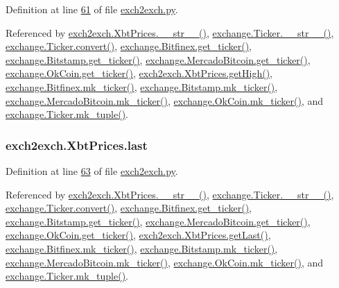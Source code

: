 Definition at line \hyperlink{exch2exch_8py_source_l00061}{61} of file \hyperlink{exch2exch_8py_source}{exch2exch.\+py}.



Referenced by \hyperlink{exch2exch_8py_source_l00091}{exch2exch.\+Xbt\+Prices.\+\_\+\+\_\+str\+\_\+\+\_\+()}, \hyperlink{exchange_8py_source_l00111}{exchange.\+Ticker.\+\_\+\+\_\+str\+\_\+\+\_\+()}, \hyperlink{exchange_8py_source_l00065}{exchange.\+Ticker.\+convert()}, \hyperlink{exchange_8py_source_l00332}{exchange.\+Bitfinex.\+get\+\_\+ticker()}, \hyperlink{exchange_8py_source_l00401}{exchange.\+Bitstamp.\+get\+\_\+ticker()}, \hyperlink{exchange_8py_source_l00535}{exchange.\+Mercado\+Bitcoin.\+get\+\_\+ticker()}, \hyperlink{exchange_8py_source_l00600}{exchange.\+Ok\+Coin.\+get\+\_\+ticker()}, \hyperlink{exch2exch_8py_source_l00076}{exch2exch.\+Xbt\+Prices.\+get\+High()}, \hyperlink{exchange_8py_source_l00346}{exchange.\+Bitfinex.\+mk\+\_\+ticker()}, \hyperlink{exchange_8py_source_l00415}{exchange.\+Bitstamp.\+mk\+\_\+ticker()}, \hyperlink{exchange_8py_source_l00549}{exchange.\+Mercado\+Bitcoin.\+mk\+\_\+ticker()}, \hyperlink{exchange_8py_source_l00614}{exchange.\+Ok\+Coin.\+mk\+\_\+ticker()}, and \hyperlink{exchange_8py_source_l00096}{exchange.\+Ticker.\+mk\+\_\+tuple()}.

\subsubsection[{\texorpdfstring{last}{last}}]{\setlength{\rightskip}{0pt plus 5cm}exch2exch.\+Xbt\+Prices.\+last}\hypertarget{classexch2exch_1_1_xbt_prices_a1da8993986574b27edcaf7259e78c899}{}\label{classexch2exch_1_1_xbt_prices_a1da8993986574b27edcaf7259e78c899}


Definition at line \hyperlink{exch2exch_8py_source_l00063}{63} of file \hyperlink{exch2exch_8py_source}{exch2exch.\+py}.



Referenced by \hyperlink{exch2exch_8py_source_l00091}{exch2exch.\+Xbt\+Prices.\+\_\+\+\_\+str\+\_\+\+\_\+()}, \hyperlink{exchange_8py_source_l00111}{exchange.\+Ticker.\+\_\+\+\_\+str\+\_\+\+\_\+()}, \hyperlink{exchange_8py_source_l00065}{exchange.\+Ticker.\+convert()}, \hyperlink{exchange_8py_source_l00332}{exchange.\+Bitfinex.\+get\+\_\+ticker()}, \hyperlink{exchange_8py_source_l00401}{exchange.\+Bitstamp.\+get\+\_\+ticker()}, \hyperlink{exchange_8py_source_l00535}{exchange.\+Mercado\+Bitcoin.\+get\+\_\+ticker()}, \hyperlink{exchange_8py_source_l00600}{exchange.\+Ok\+Coin.\+get\+\_\+ticker()}, \hyperlink{exch2exch_8py_source_l00082}{exch2exch.\+Xbt\+Prices.\+get\+Last()}, \hyperlink{exchange_8py_source_l00346}{exchange.\+Bitfinex.\+mk\+\_\+ticker()}, \hyperlink{exchange_8py_source_l00415}{exchange.\+Bitstamp.\+mk\+\_\+ticker()}, \hyperlink{exchange_8py_source_l00549}{exchange.\+Mercado\+Bitcoin.\+mk\+\_\+ticker()}, \hyperlink{exchange_8py_source_l00614}{exchange.\+Ok\+Coin.\+mk\+\_\+ticker()}, and \hyperlink{exchange_8py_source_l00096}{exchange.\+Ticker.\+mk\+\_\+tuple()}.


